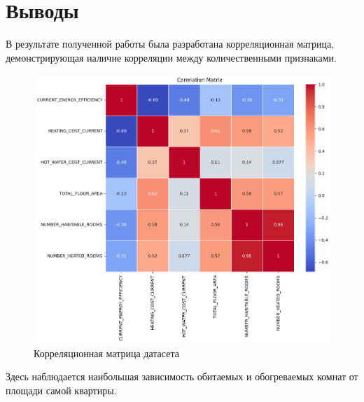 \vspace{\baselineskip}\section{Выводы}\vspace{\baselineskip}

В результате полученной работы была разработана корреляционная матрица, демонстрирующая наличие корреляции между количественными признаками.

\begin{figure}
    \centering
    \includegraphics[width=\textwidth]{Content/Images/CorMatrixOfDataset.png}
    \caption{Корреляционная матрица датасета}
    \label{fig:CorMatrixOfDataset}
\end{figure}

Здесь наблюдается наибольшая зависимость  обитаемых и обогреваемых комнат от площади самой квартиры.
